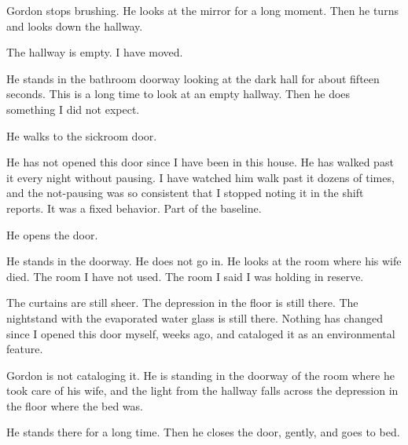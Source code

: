 Gordon stops brushing. He looks at the mirror for a long moment. Then he turns and looks down the hallway.

The hallway is empty. I have moved.

He stands in the bathroom doorway looking at the dark hall for about fifteen seconds. This is a long time to look at an empty hallway. Then he does something I did not expect.

He walks to the sickroom door.

He has not opened this door since I have been in this house. He has walked past it every night without pausing. I have watched him walk past it dozens of times, and the not-pausing was so consistent that I stopped noting it in the shift reports. It was a fixed behavior. Part of the baseline.

He opens the door.

He stands in the doorway. He does not go in. He looks at the room where his wife died. The room I have not used. The room I said I was holding in reserve.

The curtains are still sheer. The depression in the floor is still there. The nightstand with the evaporated water glass is still there. Nothing has changed since I opened this door myself, weeks ago, and cataloged it as an environmental feature.

Gordon is not cataloging it. He is standing in the doorway of the room where he took care of his wife, and the light from the hallway falls across the depression in the floor where the bed was.

He stands there for a long time. Then he closes the door, gently, and goes to bed.
